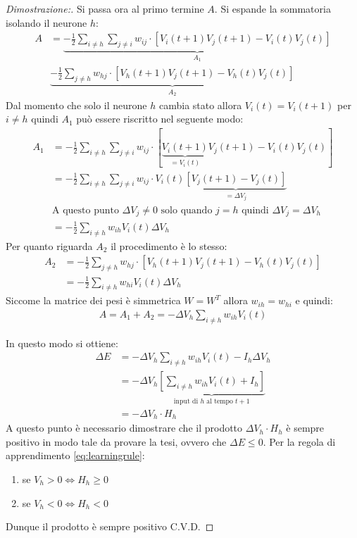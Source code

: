 \begin{proof}[Dimostrazione:]
	Si passa ora al primo termine $A$. Si espande la sommatoria isolando il neurone $h$:
	\begin{align*}
		A &= \underbrace{- \frac{1}{2} \sum_{i \neq h} \sum_{j \neq i} w_{ij} \cdot [V_i(t + 1) V_j(t + 1) - V_i(t) V_j(t)]}_\textrm{$A_1$} \\
		& \underbrace{- \frac{1}{2} \sum_{j \neq h} w_{hj} \cdot [V_h(t + 1) V_j(t + 1) - V_h(t) V_j(t)]}_\textrm{$A_2$}
	\end{align*}
	Dal momento che solo il neurone $h$ cambia stato allora $V_i(t) = V_i(t + 1)$ per $i \neq h$ quindi $A_1$ può essere riscritto nel seguente modo:
	\begin{align*}
		A_1 &= - \frac{1}{2} \sum_{i \neq h} \sum_{j \neq i} w_{ij} \cdot [\underbrace{V_i(t + 1)}_\textrm{$=V_i(t)$} V_j(t + 1) - V_i(t) V_j(t)] \\
		&= - \frac{1}{2} \sum_{i \neq h} \sum_{j \neq i} w_{ij} \cdot V_i(t) \underbrace{[V_j(t + 1) - V_j(t)]}_\textrm{$=\Delta V_j$} \\
		&\text{A questo punto $\Delta V_j \neq 0$ solo quando $j = h$ quindi $\Delta V_j = \Delta V_h$} \\
		&= - \frac{1}{2} \sum_{i \neq h} w_{ih} V_i(t) \Delta V_h
	\end{align*}
	Per quanto riguarda $A_2$ il procedimento è lo stesso:
	\begin{align*}
		A_2 &= - \frac{1}{2} \sum_{j \neq h} w_{hj} \cdot [V_h(t + 1) V_j(t + 1) - V_h(t) V_j(t)] \\
		&= - \frac{1}{2} \sum_{i \neq h} w_{hi} V_i(t) \Delta V_h
	\end{align*}
	Siccome la matrice dei pesi è simmetrica $W = W^T$ allora $w_{ih} = w_{hi}$ e quindi:
	\begin{align*}
		A = A_1 + A_2 = - \Delta V_h \sum_{i \neq h} w_{ih} V_i(t)
	\end{align*}
	
	In questo modo si ottiene:
	\begin{align*}
		\Delta E &= - \Delta V_h \sum_{i \neq h} w_{ih} V_i(t)  - I_h \Delta V_h \\
		&= - \Delta V_h \underbrace{\left[\sum_{i \neq h} w_{ih} V_i(t) + I_h \right]}_\textrm{input di $h$ al tempo $t + 1$} \\
		&= - \Delta V_h \cdot H_h
	\end{align*}
	A questo punto è necessario dimostrare che il prodotto $\Delta V_h \cdot H_h$ è sempre positivo in modo tale da provare la tesi, ovvero che $\Delta E \leq 0$. Per la regola di apprendimento \eqref{eq:learningrule}:
	\begin{enumerate}
		\item se $V_h > 0 \Leftrightarrow H_h \geq 0$
		\item se $V_h < 0 \Leftrightarrow H_h < 0$
	\end{enumerate}
	Dunque il prodotto è sempre positivo C.V.D.
\end{proof}

